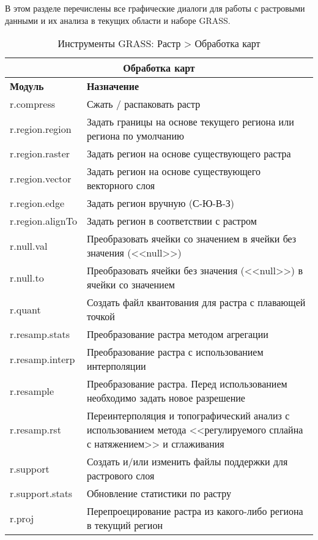 В этом разделе перечислены все графические диалоги для работы с
растровыми данными и их анализа в текущих области и наборе GRASS.

{\renewcommand{\arraystretch}{0.7}
\begin{table}[H]
\centering
 \begin{tabular}{|p{4cm}|p{11cm}|}
  \hline \multicolumn{2}{|c|}{\textbf{Обработка карт}} \\
  \hline \textbf{Модуль} & \textbf{Назначение} \\
  \hline r.compress & Сжать / распаковать растр \\
  \hline r.region.region & Задать границы на основе текущего региона
  или региона по умолчанию \\
  \hline r.region.raster & Задать регион на основе существующего растра \\
  \hline r.region.vector & Задать регион на основе существующего векторного
  слоя \\
  \hline r.region.edge & Задать регион вручную (С-Ю-В-З) \\
  \hline r.region.alignTo & Задать регион в соответствии с растром \\
  \hline r.null.val & Преобразовать ячейки со значением в ячейки без
  значения (<<null>>) \\
  \hline r.null.to & Преобразовать ячейки без значения (<<null>>) в ячейки
  со значением \\
  \hline r.quant & Создать файл квантования для растра с плавающей точкой \\
  \hline r.resamp.stats & Преобразование растра методом агрегации \\
  \hline r.resamp.interp & Преобразование растра с использованием
  интерполяции \\
  \hline r.resample & Преобразование растра. Перед использованием
  необходимо задать новое разрешение \\
  \hline r.resamp.rst & Переинтерполяция и топографический анализ с
  использованием метода <<регулируемого сплайна с натяжением>> и
  сглаживания \\
  \hline r.support &Создать и/или изменить файлы поддержки для
  растрового слоя \\
  \hline r.support.stats & Обновление статистики по растру \\
  \hline r.proj & Перепроецирование растра из какого-либо региона в
  текущий регион \\
\hline
\end{tabular}
\caption{Инструменты GRASS: Растр > Обработка карт}
\end{table}}

